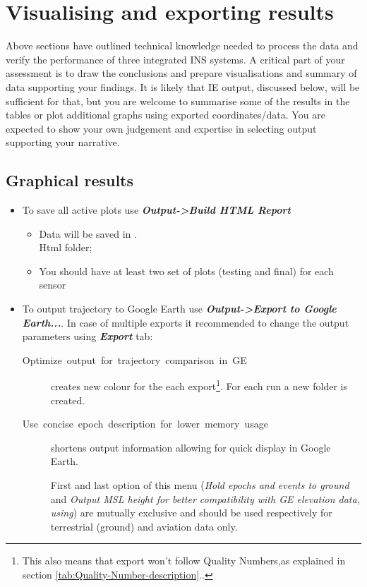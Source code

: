 \documentclass[11pt,fleqn]{book} %
\newcommand*{\refLoc}[1]{as explained in section \ref{#1}.\xspace}
\begin{document}
\chapter{Visualising and exporting  results\label{sec:Exporting-final-results}}

Above sections have outlined technical knowledge needed to process the data and verify the performance of three integrated INS systems. A critical part of your assessment is to draw the conclusions and prepare visualisations and summary of data supporting your findings. It is likely that IE output, discussed below, will be sufficient for that, but you are welcome to summarise some of the results in the tables or plot additional graphs using exported coordinates/data. You are expected to show your own judgement and expertise in selecting output supporting your narrative.

\section{Graphical results}

\begin{itemize}
	\item To save all active plots use\textbf{\emph{ Output->Build HTML Report }}
	\begin{itemize}
		\item Data will be saved in .\\Html folder;
		\item You should have at least two set of plots (testing and final) for each sensor
	\end{itemize}
	\item To output trajectory to Google Earth use\textbf{\emph{ Output->Export to Google Earth...}}. In case of multiple exports it recommended to change the output parameters using \textbf{\emph{Export}} tab:
	\begin{description}
		\item [{Optimize~output~for~trajectory~comparison~in~GE}] creates new colour for the each export\footnote{This also means that export won't follow Quality Numbers,\refLoc{tab:Quality-Number-description}.}. For each run a new folder is created.
		\item [{Use~concise~epoch~description~for~lower~memory~usage}] shortens output information allowing for quick display in Google Earth.
		\item [] First and last option of this menu (\emph{Hold epochs and events to ground }and \emph{Output MSL height for better compatibility with GE elevation data, using}) are mutually exclusive and should be used respectively for terrestrial (ground) and aviation data only.
	\end{description}
\end{itemize}
\end{document}
